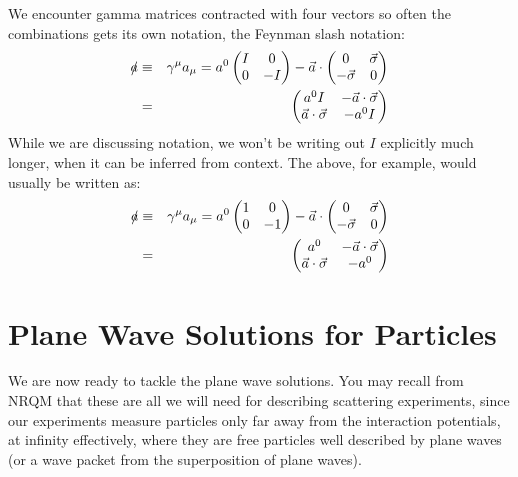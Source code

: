 \documentclass[12pt]{article}
\begin{document}
We encounter gamma matrices contracted with four vectors so often the combinations gets its own notation, the Feynman slash notation:
\begin{eqnarray*}
\slashed{a} &\equiv& \gamma^\mu a_\mu = a^0 \begin{pmatrix} I & 0 \\ 0 & -I \end{pmatrix}
- \vec{a} \cdot \begin{pmatrix} 0 & \vec{\sigma} \\ -\vec{\sigma} & 0 \end{pmatrix}\\
&=& \begin{pmatrix} a^0 I & - \vec{a}\cdot\vec{\sigma} \\ \vec{a}\cdot\vec{\sigma} & -a^0 I \end{pmatrix}
\end{eqnarray*}
While we are discussing notation, we won't be writing out $I$ explicitly much longer, when it can be inferred from context.  The above, for example, would usually be written as:
\begin{eqnarray*}
\slashed{a} &\equiv& \gamma^\mu a_\mu = a^0 \begin{pmatrix} 1 & 0 \\ 0 & -1 \end{pmatrix}
- \vec{a} \cdot \begin{pmatrix} 0 & \vec{\sigma} \\ -\vec{\sigma} & 0\end{pmatrix}\\
&=& \begin{pmatrix} a^0 & - \vec{a}\cdot\vec{\sigma} \\ \vec{a}\cdot\vec{\sigma} & -a^0 \end{pmatrix}
\end{eqnarray*}

\section{Plane Wave Solutions for Particles}

We are now ready to tackle the plane wave solutions.  You may recall
from NRQM that these are all we will need for describing scattering
experiments, since our experiments measure particles only far away
from the interaction potentials, at infinity effectively, where they
are free particles well described by plane waves (or a wave packet
from the superposition of plane waves).
\end{document}
